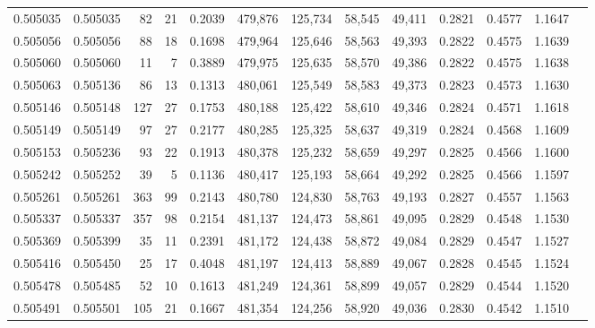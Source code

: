 \begin{tabular}{rrrrrrrrrrrrr}
0.505035 & 0.505035 &    82 &    21 &                                     0.2039 & 479,876 & 125,734 &  58,545 &  49,411 & 0.2821 & 0.4577 & 1.1647 \\
0.505056 & 0.505056 &    88 &    18 &                                     0.1698 & 479,964 & 125,646 &  58,563 &  49,393 & 0.2822 & 0.4575 & 1.1639 \\
0.505060 & 0.505060 &    11 &     7 &                                     0.3889 & 479,975 & 125,635 &  58,570 &  49,386 & 0.2822 & 0.4575 & 1.1638 \\
0.505063 & 0.505136 &    86 &    13 &                                     0.1313 & 480,061 & 125,549 &  58,583 &  49,373 & 0.2823 & 0.4573 & 1.1630 \\
0.505146 & 0.505148 &   127 &    27 &                                     0.1753 & 480,188 & 125,422 &  58,610 &  49,346 & 0.2824 & 0.4571 & 1.1618 \\
0.505149 & 0.505149 &    97 &    27 &                                     0.2177 & 480,285 & 125,325 &  58,637 &  49,319 & 0.2824 & 0.4568 & 1.1609 \\
0.505153 & 0.505236 &    93 &    22 &                                     0.1913 & 480,378 & 125,232 &  58,659 &  49,297 & 0.2825 & 0.4566 & 1.1600 \\
0.505242 & 0.505252 &    39 &     5 &                                     0.1136 & 480,417 & 125,193 &  58,664 &  49,292 & 0.2825 & 0.4566 & 1.1597 \\
0.505261 & 0.505261 &   363 &    99 &                                     0.2143 & 480,780 & 124,830 &  58,763 &  49,193 & 0.2827 & 0.4557 & 1.1563 \\
0.505337 & 0.505337 &   357 &    98 &                                     0.2154 & 481,137 & 124,473 &  58,861 &  49,095 & 0.2829 & 0.4548 & 1.1530 \\
0.505369 & 0.505399 &    35 &    11 &                                     0.2391 & 481,172 & 124,438 &  58,872 &  49,084 & 0.2829 & 0.4547 & 1.1527 \\
0.505416 & 0.505450 &    25 &    17 &                                     0.4048 & 481,197 & 124,413 &  58,889 &  49,067 & 0.2828 & 0.4545 & 1.1524 \\
0.505478 & 0.505485 &    52 &    10 &                                     0.1613 & 481,249 & 124,361 &  58,899 &  49,057 & 0.2829 & 0.4544 & 1.1520 \\
0.505491 & 0.505501 &   105 &    21 &                                     0.1667 & 481,354 & 124,256 &  58,920 &  49,036 & 0.2830 & 0.4542 & 1.1510 \\

\end{tabular}
